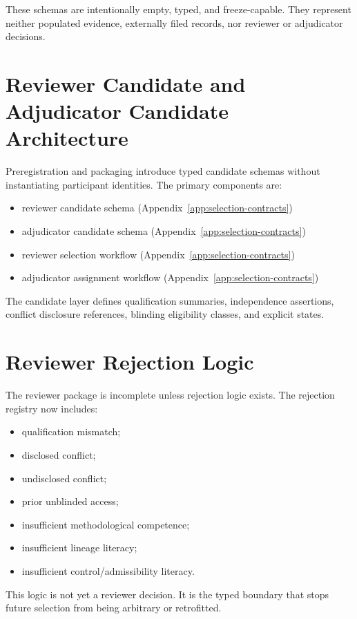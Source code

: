 \documentclass[11pt,a4paper]{article}
\newcommand{\codestate}[1]{\texttt{\detokenize{#1}}}
\begin{document}
These schemas are intentionally empty, typed, and freeze-capable. They represent
neither populated evidence, externally filed records, nor reviewer or
adjudicator decisions.

\section{Reviewer Candidate and Adjudicator Candidate Architecture}

Preregistration and packaging introduce typed candidate schemas without instantiating participant identities.
The primary components are:

\begin{itemize}
\item reviewer candidate schema (Appendix~\ref{app:selection-contracts})
\item adjudicator candidate schema (Appendix~\ref{app:selection-contracts})
\item reviewer selection workflow (Appendix~\ref{app:selection-contracts})
\item adjudicator assignment workflow (Appendix~\ref{app:selection-contracts})
\end{itemize}

The candidate layer defines qualification summaries, independence assertions,
conflict disclosure references, blinding eligibility classes, and explicit
\codestate{not_started} states.

\section{Reviewer Rejection Logic}

The reviewer package is incomplete unless rejection logic exists. The rejection
registry now includes:

\begin{itemize}
\item qualification mismatch;
\item disclosed conflict;
\item undisclosed conflict;
\item prior unblinded access;
\item insufficient methodological competence;
\item insufficient lineage literacy;
\item insufficient control/admissibility literacy.
\end{itemize}

This logic is not yet a reviewer decision. It is the typed boundary that stops
future selection from being arbitrary or retrofitted.
\end{document}
